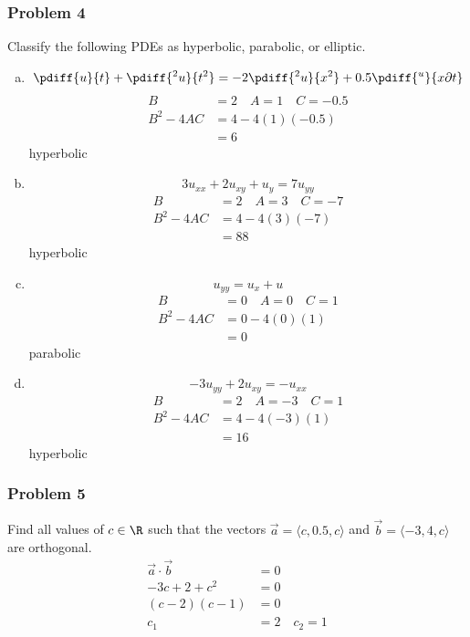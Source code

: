 \documentclass{math}
\begin{document}
\subsubsection*{Problem 4}
Classify the following PDEs as hyperbolic, parabolic, or elliptic.
\begin{enumerate}[(a)]
  \item \[\pdiff{u}{t}+\pdiff{^2u}{t^2} =
    -2\pdiff{^2u}{x^2}+0.5\pdiff{^u}{x\partial t} \]
  \begin{align*}
    B &= 2 \quad A = 1 \quad C = -0.5 \\
    B^2-4AC &= 4-4(1)(-0.5) \\
    &= 6
  \end{align*}
  hyperbolic
  \item \[ 3u_{xx}+2u_{xy}+u_y = 7u_{yy} \]
  \begin{align*}
    B &= 2 \quad A = 3 \quad C = -7 \\
    B^2-4AC &= 4-4(3)(-7) \\
    &= 88
  \end{align*}
  hyperbolic
  \item \[ u_{yy} = u_x+u \]
  \begin{align*}
    B &= 0 \quad A = 0 \quad C = 1 \\
    B^2-4AC &= 0-4(0)(1) \\
    &= 0
  \end{align*}
  parabolic
  \item \[ -3u_{yy}+2u_{xy} = -u_{xx} \]
  \begin{align*}
    B &= 2 \quad A = -3 \quad C = 1 \\
    B^2-4AC &= 4-4(-3)(1) \\
    &= 16
  \end{align*}
  hyperbolic
\end{enumerate}

\subsubsection*{Problem 5}
Find all values of \( c\in\R \) such that the vectors \( \vec{a} = \langle
c,0.5,c\rangle \) and \( \vec{b} = \langle-3,4,c\rangle \) are orthogonal.
\begin{align*}
  \vec{a}\cdot\vec{b} &= 0 \\
  -3c+2+c^2 &= 0 \\
  (c-2)(c-1) &= 0 \\
  c_1 &= 2 \quad c_2 = 1
\end{align*}
\end{document}
